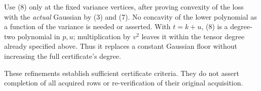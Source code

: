 \documentclass[11pt,a4paper]{article}
\begin{document}
Use (8) only at the fixed variance vertices, after proving convexity
of the loss with the \emph{actual} Gaussian by (3) and (7).
No concavity of the lower polynomial as a function of the variance
is needed or asserted. With $t=k+u$, (8) is a degree-two polynomial
in $p,u$; multiplication by $v^2$ leaves it within the tensor degree
already specified above. Thus it replaces a constant Gaussian floor
without increasing the full certificate's degree.

These refinements establish sufficient certificate criteria. They do
not assert completion of all acquired rows or re-verification of
their original acquisition.
\end{document}
